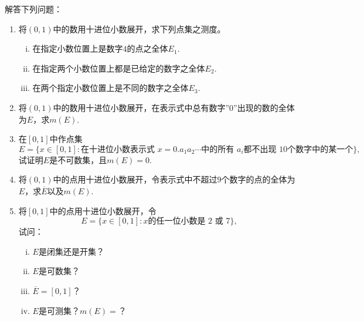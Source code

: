 \documentclass[../../main.tex]{subfiles}%
\begin{document}
\begin{example}
解答下列问题：
\begin{enumerate}[(1)]
\item 将$(0,1)$中的数用十进位小数展开，求下列点集之测度。
\begin{enumerate}[(i)]
\item 在指定小数位置上是数字$4$的点之全体$E_1$.
\item 在指定两个小数位置上都是已给定的数字之全体$E_2$.
\item 在两个指定小数位置上是不同的数字之全体$E_3$.
\end{enumerate}

\item 将$(0,1)$中的数用十进位小数展开，在表示式中总有数字''$0$''出现的数的全体为$E$，求$m(E)$.
\item 在$[0,1]$中作点集
\[
E=\{x\in[0,1]: \text{在十进位小数表示式 }x=0.a_1a_2\cdots\text{中的所有 }a_i\text{都不出现 }10\text{个数字中的某一个}\},
\]
试证明$E$是不可数集，且$m(E)=0$.
\item 将$(0,1)$中的点用十进位小数展开，令表示式中不超过$9$个数字的点的全体为$E$，求$\overline{E}$以及$m(E)$.
\item 将$[0,1]$中的点用十进位小数展开，令
\[
E = \{x\in[0,1]: x\text{的任一位小数是 }2\text{ 或 }7\},
\]
试问：
\begin{enumerate}[(i)]
\item $E$是闭集还是开集？

\item $E$是可数集？

\item $\overline{E}=[0,1]$？

\item $E$是可测集？$m(E)=$？
\end{enumerate}
\end{enumerate}
\end{example}
\end{document}
